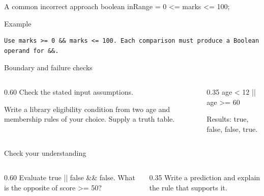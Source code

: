 \documentclass[10pt,aspectratio=169]{beamer}
\begin{document}
\begin{frame}[fragile,t]{A common incorrect approach}
boolean inRange = 0 \textless{}= marks \textless{}= 100;
\vspace{1mm}\begin{block}{Example}
\begin{lstlisting}
Use marks >= 0 && marks <= 100. Each comparison must produce a Boolean operand for &&.
\end{lstlisting}
\end{block}
\end{frame}

\begin{frame}[fragile,t]{Boundary and failure checks}
\begin{columns}[T,onlytextwidth]\begin{column}{0.60\textwidth}
Check the stated input assumptions.

Write a library eligibility condition from two age and membership rules of your choice. Supply a truth table.
\end{column}\begin{column}{0.35\textwidth}\small
age \textless{} 12 || age \textgreater{}= 60\par Results: true, false, false, true.
\end{column}\end{columns}
\end{frame}

\begin{frame}[fragile,t]{Check your understanding}
\begin{columns}[T,onlytextwidth]\begin{column}{0.60\textwidth}
Evaluate true || false \&\& false. What is the opposite of score \textgreater{}= 50?
\end{column}\begin{column}{0.35\textwidth}\small
Write a prediction and explain the rule that supports it.
\end{column}\end{columns}
\end{frame}
\end{document}
